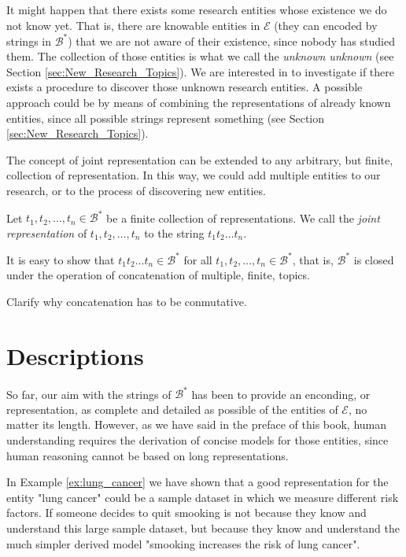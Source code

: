 It might happen that there exists some research entities whose existence we do not know yet. That is, there are knowable entities in $\mathcal{E}$ (they can encoded by strings in $\mathcal{B}^\ast$) that we are not aware of their existence, since nobody has studied them. The collection of those entities is what we call the \emph{unknown unknown} (see Section \ref{sec:New_Research_Topics}). We are interested in to investigate if there exists a procedure to discover those unknown research entities. A possible approach could be by means of combining the representations of already known entities, since all possible strings represent something (see Section \ref{sec:New_Research_Topics}).

The concept of joint representation can be extended to any arbitrary, but finite, collection of representation. In this way, we could add multiple entities to our research, or to the process of discovering new entities.

\begin{definition}
Let $t_1, t_2, \ldots, t_n \in \mathcal{B}^\ast$ be a finite collection of representations. We call the \emph{joint representation} of $t_1, t_2, \ldots, t_n$ to the string $t_1 t_2 \ldots t_n$.
\end{definition}

It is easy to show that $t_1 t_2 \ldots t_n \in \mathcal{B}^\ast$ for all $t_1, t_2, \ldots, t_n \in \mathcal{B}^\ast$, that is, $\mathcal{B}^\ast$ is closed under the operation of concatenation of multiple, finite, topics.

{\color{red} Clarify why concatenation has to be conmutative.}


%
%

\section{Descriptions}
\label{sec:descriptions_models}

So far, our aim with the strings of $\mathcal{B}^\ast$ has been to provide an enconding, or representation, as complete and detailed as possible of the entities of $\mathcal{E}$, no matter its length. However, as we have said in the preface of this book, human understanding requires the derivation of concise models for those entities, since human reasoning cannot be based on long representations.

\begin{example}
In Example \ref{ex:lung_cancer} we have shown that a good representation for the entity "lung cancer" could be a sample dataset in which we measure different risk factors. If someone decides to quit smooking is not because they know and understand this large sample dataset, but because they know and understand the much simpler derived model "smooking increases the risk of lung cancer".
\end{example}

